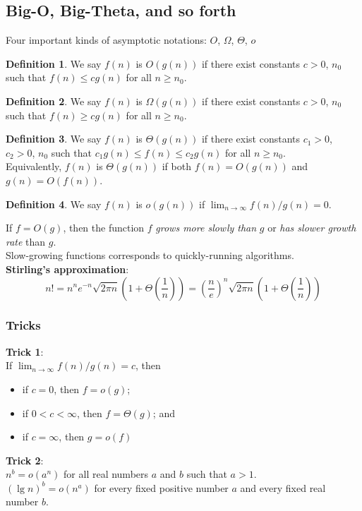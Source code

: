 \documentclass[12pt]{article}
\theoremstyle{plain}
\theoremstyle{definition}
\newtheorem*{defn*}{Definition}
\begin{document}
\subsection{Big-O, Big-Theta, and so forth}
Four important kinds of asymptotic notations: $O$, $\Omega$, $\Theta$, $o$

\begin{defn*}
We say $f(n)$ is $O(g(n))$ if there exist constants $c > 0$, $n_{0}$ such that $f(n) \leq cg(n)$ for all $n \geq n_{0}$.
\end{defn*}

\begin{defn*}
We say $f(n)$ is $\Omega(g(n))$ if there exist constants $c > 0$, $n_{0}$ such that $f(n) \geq cg(n)$ for all $n \geq n_{0}$.
\end{defn*}

\begin{defn*}
We say $f(n)$ is $\Theta(g(n))$ if there exist constants $c_{1} > 0$, $c_{2} > 0$, $n_{0}$ such that $c_{1}g(n) \leq f(n) \leq c_{2}g(n)$ for all $n \geq n_{0}$. \\
Equivalently, $f(n)$ is $\Theta(g(n))$ if both $f(n) = O(g(n))$ and $g(n) = O(f(n))$.
\end{defn*}

\begin{defn*}
We say $f(n)$ is $o(g(n))$ if $\lim_{n\to\infty}f(n)/g(n) = 0$.
\end{defn*}

If $f = O(g)$, then the function $f$ \emph{grows more slowly than} $g$ or \emph{has slower growth rate} than $g$. \\
Slow-growing functions corresponds to quickly-running algorithms. \\

\textbf{Stirling's approximation}:
$$n! = n^{n}e^{-n}\sqrt{2\pi n}\left(1 + \Theta\left(\frac{1}{n}\right)\right) = \left(\frac{n}{e}\right)^{n}\sqrt{2\pi n}\left(1 + \Theta\left(\frac{1}{n}\right)\right)$$

\subsubsection{Tricks}
\textbf{Trick 1}: \\
If $\lim_{n\to\infty}f(n)/g(n) = c$, then
\begin{itemize}
  \item if $c = 0$, then $f = o(g)$;
  \item if $0 < c < \infty$, then $f = \Theta(g)$; and
  \item if $c = \infty$, then $g = o(f)$
\end{itemize}
\medskip \textbf{Trick 2}: \\
$n^{b} = o(a^{n})$ for all real numbers $a$ and $b$ such that $a > 1$. \\
$(\lg{n})^{b} = o(n^{a})$ for every fixed positive number $a$ and every fixed real number $b$. \\
\end{document}
